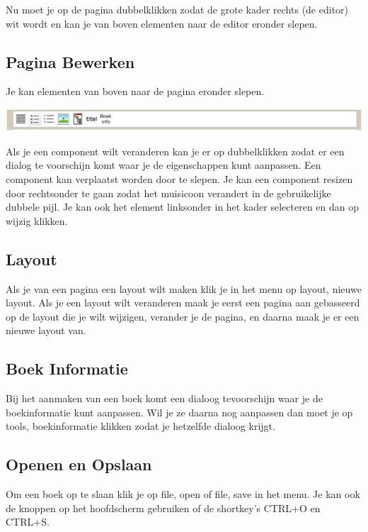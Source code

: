 \documentclass[a4paper,11pt]{article}
\begin{document}
Nu moet je op de pagina dubbelklikken zodat de grote kader rechts (de editor) wit wordt en kan je van boven elementen
naar de editor eronder slepen.

\subsection{Pagina Bewerken}

Je kan elementen van boven naar de pagina eronder slepen.

\includegraphics{fig4.png}

Als je een component wilt veranderen kan je er op dubbelklikken zodat er een dialog te voorschijn komt waar je de eigenschappen kunt aanpassen.
Een component kan verplaatst worden door te slepen. Je kan een component  resizen door rechtsonder te gaan zodat het muisicoon verandert in de
gebruikelijke dubbele pijl. Je kan ook het element linksonder in het kader selecteren en dan op wijzig klikken.

\subsection{Layout}

Als je van een pagina een layout wilt maken klik je in het menu op layout, nieuwe layout. Als je een layout wilt veranderen maak je eerst een pagina
aan gebasseerd op de layout die je wilt wijzigen, verander je de pagina, en daarna maak je er een nieuwe layout van.

\subsection{Boek Informatie}

Bij het aanmaken van een boek komt een dialoog tevoorschijn waar je de boekinformatie kunt aanpassen. Wil je ze daarna nog aanpassen dan moet je
op tools, boekinformatie klikken zodat je hetzelfde dialoog krijgt.

\subsection{Openen en Opslaan}

Om een boek op te slaan klik je op file, open of file, save in het menu. Je kan ook de knoppen op het hoofdscherm gebruiken of de shortkey's
CTRL+O en CTRL+S.
\end{document}
